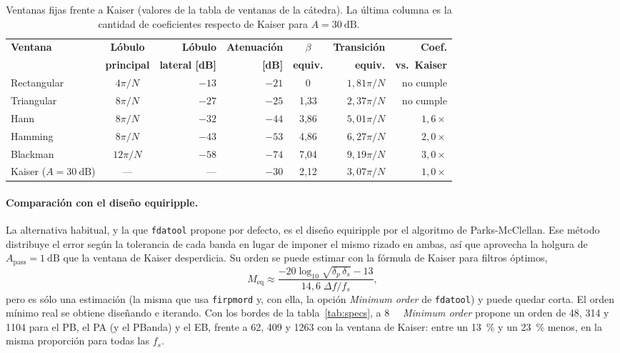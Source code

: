 \documentclass[11pt,a4paper]{article}
\begin{document}
\begin{table}[H]
\centering
\caption{Ventanas fijas frente a Kaiser (valores de la tabla de ventanas de la
cátedra). La última columna es la cantidad de coeficientes respecto de Kaiser
para $A = \qty{30}{\deci\bel}$.}
\label{tab:ventanas}
\begin{tabular}{@{}l c r r c r r@{}}
\toprule
\textbf{Ventana} & \textbf{Lóbulo} & \textbf{Lóbulo} & \textbf{Atenuación} &
\textbf{$\beta$} & \textbf{Transición} & \textbf{Coef.}\\
 & \textbf{principal} & \textbf{lateral [dB]} & \textbf{[dB]} &
\textbf{equiv.} & \textbf{equiv.} & \textbf{vs.\ Kaiser}\\
\midrule
Rectangular & $4\pi/N$  & $-13$ & $-21$ & 0    & $1{,}81\pi/N$ & no cumple\\
Triangular  & $8\pi/N$  & $-27$ & $-25$ & 1,33 & $2{,}37\pi/N$ & no cumple\\
Hann        & $8\pi/N$  & $-32$ & $-44$ & 3,86 & $5{,}01\pi/N$ & $1{,}6\times$\\
Hamming     & $8\pi/N$  & $-43$ & $-53$ & 4,86 & $6{,}27\pi/N$ & $2{,}0\times$\\
Blackman    & $12\pi/N$ & $-58$ & $-74$ & 7,04 & $9{,}19\pi/N$ & $3{,}0\times$\\
Kaiser ($A = \qty{30}{\deci\bel}$) & --- & --- & $-30$ & 2,12 & $3{,}07\pi/N$ & $1{,}0\times$\\
\bottomrule
\end{tabular}
\end{table}

\paragraph{Comparación con el diseño equiripple.} La alternativa habitual,
y la que \texttt{fdatool} propone por defecto, es el diseño equiripple por el
algoritmo de Parks-McClellan. Ese método distribuye el error según la
tolerancia de cada banda en lugar de imponer el mismo rizado en ambas, así
que aprovecha la holgura de $A_{\text{pass}} = \qty{1}{\deci\bel}$ que la
ventana de Kaiser desperdicia. Su orden se puede estimar con la fórmula de
Kaiser para filtros óptimos,
\begin{equation}
  M_{\text{eq}} \approx
  \frac{-20\log_{10}\sqrt{\delta_p\,\delta_s} - 13}{14{,}6\;\Delta f/f_s},
  \label{eq:equiripple}
\end{equation}
pero es sólo una estimación (la misma que usa \texttt{firpmord} y, con ella,
la opción \emph{Minimum order} de \texttt{fdatool}) y puede quedar corta. El
orden mínimo real se obtiene diseñando e iterando. Con los bordes de la
tabla~\ref{tab:specs}, a \qty{8}{\kilo\sps} \emph{Minimum order} propone un
orden de 48, 314 y \num{1104} para el PB, el PA (y el PBanda) y el EB, frente
a 62, 409 y \num{1263} con la ventana de Kaiser: entre un \qty{13}{\percent}
y un \qty{23}{\percent} menos, en la misma proporción para todas las $f_s$.
\end{document}
